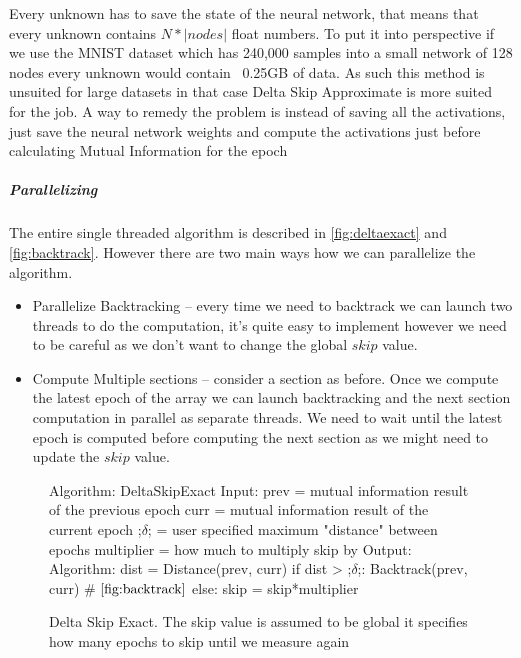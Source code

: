 \documentclass[dissertation.tex]{subfiles}
\begin{document}
  Every unknown has to save the state of the neural network, that means that
  every unknown contains $N*|nodes|$ float numbers. To put it into perspective
  if we use the MNIST dataset which has 240,000 samples into a small network of
  128 nodes every unknown would contain ~0.25GB of data. As such this method is
  unsuited for large datasets in that case Delta Skip Approximate is more suited
  for the job. A way to remedy the problem is instead of saving all the
  activations, just save the neural network weights and compute the activations
  just before calculating Mutual Information for the epoch
  
  \subparagraph{Parallelizing} 
  The entire single threaded algorithm is described in \autoref{fig:deltaexact}
  and \autoref{fig:backtrack}. However there are two main ways how we can
  parallelize the algorithm.
  \begin{itemize}
    \item{
        Parallelize Backtracking -- every time we need to backtrack we can
        launch two threads to do the computation, it's quite easy to implement
        however we need to be careful as we don't want to change the global
        $skip$ value.
      }
    \item{
        Compute Multiple sections -- consider a section as before.
        Once we compute the latest epoch of the array we can launch backtracking
        and the next section computation in parallel as separate threads.
        We need to wait until the latest epoch is computed before computing the
        next section as we might need to
        update the $skip$ value.
      }
  \end{itemize}

  

\begin{figure}[H]
    \begin{pythonfigure}
      Algorithm: DeltaSkipExact
      Input:
      prev = mutual information result of the previous epoch
      curr = mutual information result of the current epoch
      ;$\delta$; = user specified maximum "distance" between epochs
      multiplier = how much to multiply skip by
      Output:
      Algorithm:
      dist = Distance(prev, curr)
      if dist > ;$\delta$;:
        Backtrack(prev, curr) # $\autoref{fig:backtrack}$
      else:
        skip = skip*multiplier
    \end{pythonfigure}
    \caption{Delta Skip Exact. The skip value is assumed to be global it
    specifies how many epochs to skip until we measure again}
    \label{fig:deltaexact}
\end{figure}
\end{document}
